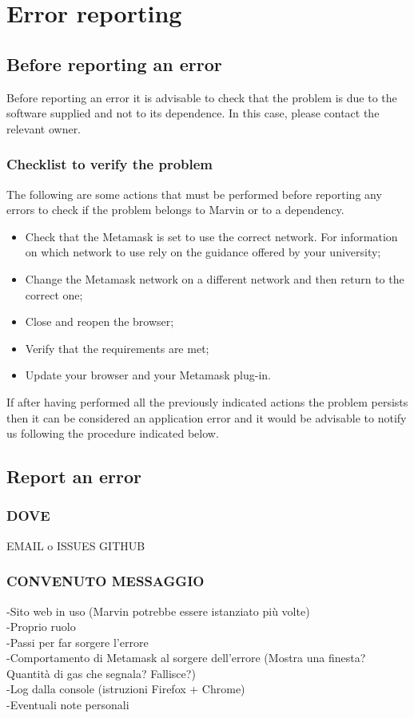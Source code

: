\documentclass[ManualeUtente]{subfiles}
\begin{document}
\chapter{Error reporting}
\section{Before reporting an error}
Before reporting an error it is advisable to check that the problem is due to the software supplied and not to its dependence. In this case, please contact the relevant owner. \\

\subsection{Checklist to verify the problem}
The following are some actions that must be performed before reporting any errors to check if the problem belongs to Marvin or to a dependency.

\begin{itemize}
	\item Check that the Metamask is set to use the correct network. For information on which network to use rely on the guidance offered by your university;
	\item Change the Metamask network on a different network and then return to the correct one;
	\item Close and reopen the browser;
	\item Verify that the requirements are met;
	\item Update your browser and your Metamask plug-in.
\end{itemize}

If after having performed all the previously indicated actions the problem persists then it can be considered an application error and it would be advisable to notify us following the procedure indicated below.

\section{Report an error}
\subsection{DOVE}
EMAIL o ISSUES GITHUB

\subsection{CONVENUTO MESSAGGIO}
-Sito web in uso (Marvin potrebbe essere istanziato più volte) \\
-Proprio ruolo \\
-Passi per far sorgere l'errore \\
-Comportamento di Metamask al sorgere dell'errore (Mostra una finesta? Quantità di gas che segnala? Fallisce?) \\
-Log dalla console (istruzioni Firefox + Chrome) \\
-Eventuali note personali
\end{document}
